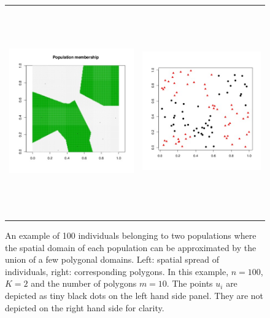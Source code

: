 \documentclass{article}
\begin{document}
\begin{figure}[h]
\begin{tabular}{cc}
\includegraphics[height=9cm,width=8cm]{../inst/images/example_spatial3_bis.jpeg} & \includegraphics[height=9cm,width=7.6cm]{../inst/images/example_spatial3_ter.jpeg} \\
\end{tabular}
\caption{An example of 100 individuals belonging to two populations  where the 
spatial domain of each population can be approximated by the union of a few polygonal domains. Left: spatial spread of individuals, 
right: corresponding polygons. 
In this example, $n=100$, $K=2$ and the number of polygons $m=10$.
The points $u_i$ are depicted as tiny black dots on the left hand side panel. They are not depicted on the right hand side 
for clarity.}\label{fig:spaprior2}
\end{figure}
\end{document}

